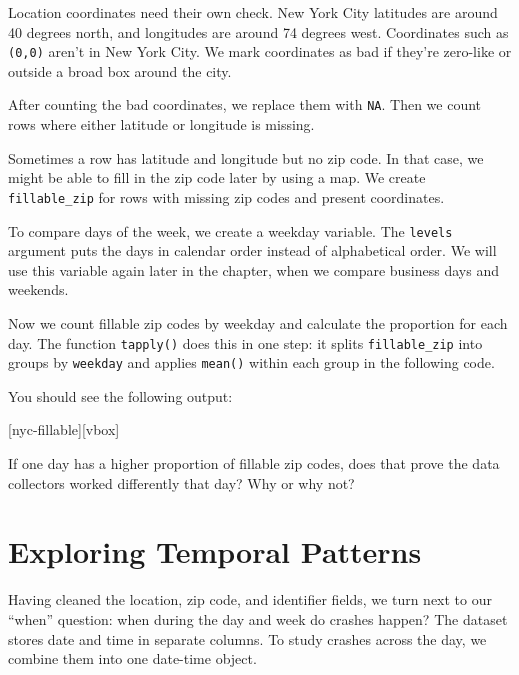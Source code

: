 Location coordinates need their own check. New York City
latitudes are around 40 degrees north, and
longitudes are around 74 degrees west.
Coordinates such as \lstinline{(0,0)} aren't in New York City. We mark
coordinates as bad if they're zero-like or outside a broad box around
the city.


After counting the bad coordinates, we replace them with \lstinline{NA}.
Then we count rows where either latitude or longitude is missing.


Sometimes a row has latitude and longitude but no zip code. In that
case, we might be able to fill in the zip code later by using a map. We
create \lstinline{fillable_zip} for rows with missing zip codes and
present coordinates.


To compare days of the week, we create a  weekday
variable. The
\lstinline{levels} argument puts the days in calendar order instead of
alphabetical order. We will use this variable again later in the
chapter, when we compare business days and weekends.


Now we count fillable zip codes by weekday and calculate the
proportion for each day. The function \lstinline{tapply()} does this in one step:
it splits \lstinline{fillable_zip} into groups by \lstinline{weekday}
and applies \lstinline{mean()} within each group in the following code.


You should see the following output:

[nyc-fillable][vbox]

If one day has a higher proportion of fillable zip codes, does that
prove the data collectors worked differently that day? Why or why not?

\section{Exploring Temporal Patterns}

Having cleaned the location, zip code, and identifier fields, we turn
next to our ``when'' question: when during the day and week do
crashes happen? The dataset stores date and time in separate columns.
To study crashes across the day, we combine them into one date-time
object.

